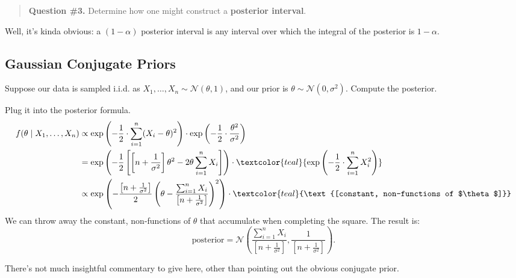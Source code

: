 \begin{quote}
    \textbf{Question \#3.}
    Determine how one might construct a \textbf{posterior interval}.
\end{quote}

Well, it's kinda obvious: a $(1 - \alpha)$ posterior interval
is any interval over which the integral of the posterior is $1 - \alpha$.

\subsection{Gaussian Conjugate Priors}

\begin{problem}
    Suppose our data is sampled i.i.d. as
    $X_1, \dots, X_n \sim \mathcal{N}(\theta, 1)$,
    and our prior is $\theta \sim \mathcal{N}(0, \sigma^2)$.
    Compute the posterior.
\end{problem}

\begin{solution}
    Plug it into the posterior formula.
    \begin{align*}
        f(\theta \mid X_1, \dots, X_n)
        & \propto \exp\left(
            -\frac{1}{2} \cdot \sum_{i = 1}^n (X_i - \theta)^2
        \right) \cdot \exp\left(
                -\frac{1}{2} \cdot \frac{\theta^2}{\sigma^2}
        \right) \\
        & = \exp\left(-\frac{1}{2} \left[
            \left[n + \frac{1}{\sigma^2}\right]\theta^2
            - 2\theta \sum_{i = 1}^n X_i
        \right]\right) \cdot
        \textcolor{teal}{
            \exp\left(-\frac{1}{2} \cdot \sum_{i = 1}^n X_i^2\right)
         } \\
        & \propto \exp\left(
            -\frac{\left[n + \frac{1}{\sigma^2}\right]}{2} \left(
                \theta - \frac{\sum_{i = 1}^n X_i}{
                    \left[n + \frac{1}{\sigma^2}\right]
                }
            \right)^2
        \right) \cdot
        \textcolor{teal}{\text{[constant, non-functions of $\theta$]}}
    \end{align*}
    We can throw away the constant, non-functions of $\theta$
    that accumulate when completing the square.  The result is:
    \[ \text{posterior} = \mathcal{N}\left(
        \frac{\sum_{i = 1}^n X_i}{\left[n + \frac{1}{\sigma^2}\right]},
        \frac{1}{\left[n + \frac{1}{\sigma^2}\right]}
    \right). \]
\end{solution}

There's not much insightful commentary to give here,
other than pointing out the obvious conjugate prior.

